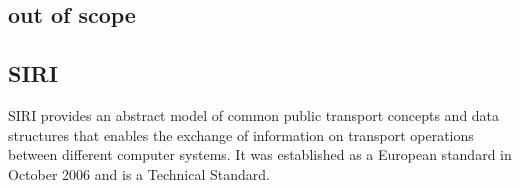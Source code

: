 \begin{appendices}
\section*{out of scope}
\subsection*{SIRI}
SIRI provides an abstract model of common public transport concepts and data structures that enables the exchange of information on transport operations between different computer systems. It was established as a European standard in October 2006 and is a  Technical Standard.



\end{appendices}